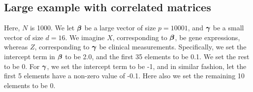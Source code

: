 \subsection{Large example with correlated matrices}
Here, $N$ is 1000. We let $\boldsymbol{\beta}$ be a large vector of size $p=10001$, and $\boldsymbol{\gamma}$ be a small vector of size $d=16$. We imagine $X$, corresponding to $\boldsymbol{\beta}$, be gene expressions, whereas $Z$, corresponding to $\boldsymbol{\gamma}$ be clinical measurements. Specifically, we set the intercept term in $\boldsymbol{\beta}$ to be 2.0, and the first 35 elements to be 0.1. We set the rest to be 0. For $\boldsymbol{\gamma}$, we set the intercept term to be -1, and in similar fashion, let the first 5 elements have a non-zero value of -0.1. Here also we set the remaining 10 elements to be 0.
